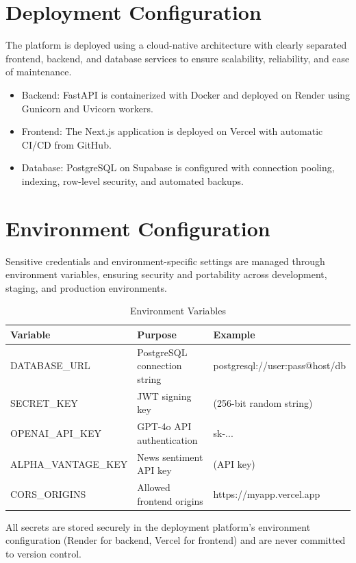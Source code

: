 \section{Deployment Configuration}

The platform is deployed using a cloud-native architecture with clearly separated frontend, backend, and database services to ensure scalability, reliability, and ease of maintenance.

\begin{itemize}
    \item {Backend:} FastAPI is containerized with Docker and deployed on Render using Gunicorn and Uvicorn workers.
    \item {Frontend:} The Next.js application is deployed on Vercel with automatic CI/CD from GitHub.
    \item {Database:} PostgreSQL on Supabase is configured with connection pooling, indexing, row-level security, and automated backups.
\end{itemize}

\section{Environment Configuration}

Sensitive credentials and environment-specific settings are managed through environment variables, ensuring security and portability across development, staging, and production environments.

\begin{table}[H]
\centering
\begin{tabular}{lll}
\toprule
\textbf{Variable} & \textbf{Purpose} & \textbf{Example} \\
\midrule
DATABASE\_URL & PostgreSQL connection string & postgresql://user:pass@host/db \\
SECRET\_KEY & JWT signing key & (256-bit random string) \\
OPENAI\_API\_KEY & GPT-4o API authentication & sk-... \\
ALPHA\_VANTAGE\_KEY & News sentiment API key & (API key) \\
CORS\_ORIGINS & Allowed frontend origins & https://myapp.vercel.app \\
\bottomrule
\end{tabular}
\caption{Environment Variables}
\label{tab:env_vars}
\end{table}

All secrets are stored securely in the deployment platform's environment configuration (Render for backend, Vercel for frontend) and are never committed to version control.

